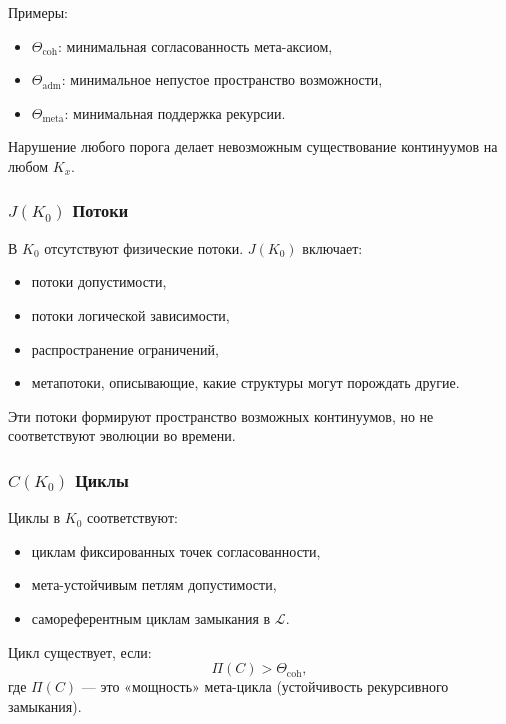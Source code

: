 Примеры:
\begin{itemize}
    \item $\Theta_{\mathrm{coh}}$: минимальная согласованность мета-аксиом,
    \item $\Theta_{\mathrm{adm}}$: минимальное непустое пространство
          возможности,
    \item $\Theta_{\mathrm{meta}}$: минимальная поддержка рекурсии.
\end{itemize}

Нарушение любого порога делает невозможным существование континуумов на
любом $K_x$.

\subsubsection{\texorpdfstring{$J(K_0)$}{J(K_0)} Потоки}

В $K_0$ отсутствуют физические потоки.
$J(K_0)$ включает:
\begin{itemize}
    \item потоки допустимости,
    \item потоки логической зависимости,
    \item распространение ограничений,
    \item метапотоки, описывающие, какие структуры могут порождать
          другие.
\end{itemize}

Эти потоки формируют пространство возможных континуумов, но не
соответствуют эволюции во времени.

\subsubsection{\texorpdfstring{$C(K_0)$}{C(K_0)} Циклы}

Циклы в $K_0$ соответствуют:
\begin{itemize}
    \item циклам фиксированных точек согласованности,
    \item мета-устойчивым петлям допустимости,
    \item самореферентным циклам замыкания в $\mathcal{L}$.
\end{itemize}

Цикл существует, если:
\[
\Pi(C) > \Theta_{\mathrm{coh}},
\]
где $\Pi(C)$ — это «мощность» мета-цикла (устойчивость рекурсивного
замыкания).

